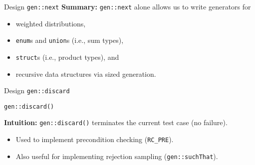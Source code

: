 \begin{frame}[fragile]{\halcheck{} \textemdash{} Design \textemdash{} \texttt{gen::next}}
  \textbf{Summary:} \texttt{gen::next} alone allows us to write generators for
  \begin{itemize}
    \item weighted distributions,
    \item \texttt{enum}s and \texttt{union}s (i.e., sum types),
    \item \texttt{struct}s (i.e., product types), and
    \item recursive data structures via sized generation.
  \end{itemize}
\end{frame}

\begin{frame}[fragile]{\halcheck{} \textemdash{} Design \textemdash{} \texttt{gen::discard}}
  \begin{center}
    \texttt{gen::discard()}
  \end{center}

  \textbf{Intuition:} \texttt{gen::discard()} terminates the current test case (no failure).

  \begin{itemize}
    \item Used to implement precondition checking (\texttt{RC_PRE}).
    \item Also useful for implementing rejection sampling (\texttt{gen::suchThat}).
  \end{itemize}
\end{frame}

